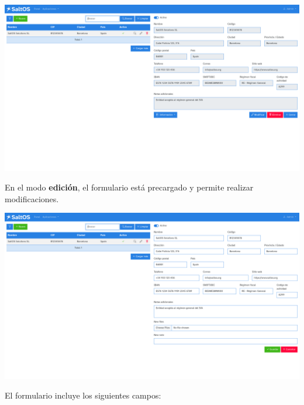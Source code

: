 \documentclass[a4paper]{article}
\begin{document}
\begin{center}\includegraphics[width=1\textwidth]{../ujest/snaps/test-screenshots-js-screenshots-company-company-view-1-es-es-1-snap.png}\end{center}

En el modo \textbf{edición}, el formulario está precargado y permite realizar modificaciones.

\begin{center}\includegraphics[width=1\textwidth]{../ujest/snaps/test-screenshots-js-screenshots-company-company-edit-1-es-es-1-snap.png}\end{center}

El formulario incluye los siguientes campos:
\end{document}
